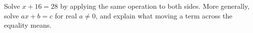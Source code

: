 Solve $x+16=28$ by applying the same operation to both sides. More generally, solve $ax+b=c$ for real $a\ne0$, and explain what moving a term across the equality means.
